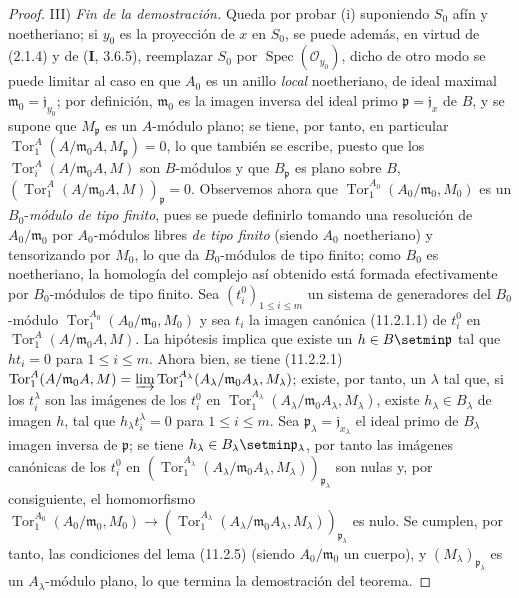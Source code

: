 \begin{proof}
\medskip
\noindent III) \emph{Fin de la demostración.} Queda por probar
(i) suponiendo $S_0$ afín y noetheriano; si $y_0$ es la proyección de
$x$ en $S_0$, se puede además, en virtud de (2.1.4) y de
($\mathbf I$, 3.6.5), reemplazar $S_0$ por
$\operatorname{Spec}(\mathcal O_{y_0})$, dicho de otro modo se puede limitar al
caso en que $A_0$ es un anillo \emph{local} noetheriano, de ideal maximal
$\mathfrak m_0=\mathfrak j_{y_0}$; por definición, $\mathfrak m_0$ es
la imagen inversa del ideal primo $\mathfrak p=\mathfrak j_x$ de $B$,
y se supone que $M_{\mathfrak p}$ es un $A$-módulo plano; se tiene, por tanto, en
particular $\operatorname{Tor}_1^A(A/\mathfrak m_0A,M_{\mathfrak p})=0$,
lo que también se escribe, puesto que los $\operatorname{Tor}_i^A(A/\mathfrak m_0A,M)$
son $B$-módulos y que $B_{\mathfrak p}$ es plano sobre $B$,
$(\operatorname{Tor}_1^A(A/\mathfrak m_0A,M))_{\mathfrak p}=0$.
Observemos ahora que $\operatorname{Tor}_1^{A_0}(A_0/\mathfrak m_0,M_0)$
es un $B_0$-\emph{módulo de tipo finito}, pues se puede definirlo tomando
una resolución de $A_0/\mathfrak m_0$ por $A_0$-módulos libres
\emph{de tipo finito} (siendo $A_0$ noetheriano) y tensorizando por $M_0$, lo
que da $B_0$-módulos de tipo finito; como $B_0$ es noetheriano,
la homología del complejo así obtenido está formada efectivamente por $B_0$-módulos de
tipo finito. Sea $(t_i^0)_{1\leq i\leq m}$ un sistema de generadores del
$B_0$-módulo $\operatorname{Tor}_1^{A_0}(A_0/\mathfrak m_0,M_0)$ y sea
$t_i$ la imagen canónica (11.2.1.1) de $t_i^0$ en
$\operatorname{Tor}_1^A(A/\mathfrak m_0A,M)$. La hipótesis implica que
existe un $h\in B\setmin\mathfrak p$ tal que $ht_i=0$ para $1\leq i\leq m$. Ahora bien,
se tiene (11.2.2.1)
$\operatorname{Tor}_1^A(A/\mathfrak m_0A,M)=
\varinjlim\operatorname{Tor}_1^{A_\lambda}
(A_\lambda/\mathfrak m_0A_\lambda,M_\lambda)$;
existe, por tanto, un $\lambda$ tal que, si los $t_i^\lambda$ son las imágenes
de los $t_i^0$ en
$\operatorname{Tor}_1^{A_\lambda}(A_\lambda/\mathfrak m_0A_\lambda,
M_\lambda)$, existe $h_\lambda\in B_\lambda$ de imagen $h$, tal que
$h_\lambda t_i^\lambda=0$ para $1\leq i\leq m$. Sea
$\mathfrak p_\lambda=\mathfrak j_{x_\lambda}$ el ideal primo de
$B_\lambda$ imagen inversa de $\mathfrak p$; se tiene
$h_\lambda\in B_\lambda\setmin\mathfrak p_\lambda$, por tanto las imágenes canónicas
de los $t_i^0$ en
$(\operatorname{Tor}_1^{A_\lambda}(A_\lambda/\mathfrak m_0A_\lambda,
M_\lambda))_{\mathfrak p_\lambda}$ son nulas y, por consiguiente,
el homomorfismo
$\operatorname{Tor}_1^{A_0}(A_0/\mathfrak m_0,M_0)\to
(\operatorname{Tor}_1^{A_\lambda}(A_\lambda/\mathfrak m_0A_\lambda,
M_\lambda))_{\mathfrak p_\lambda}$ es nulo. Se cumplen, por tanto, las condiciones del
lema (11.2.5) (siendo $A_0/\mathfrak m_0$ un cuerpo), y
$(M_\lambda)_{\mathfrak p_\lambda}$ es un $A_\lambda$-módulo plano, lo que
termina la demostración del teorema.


\end{proof}

